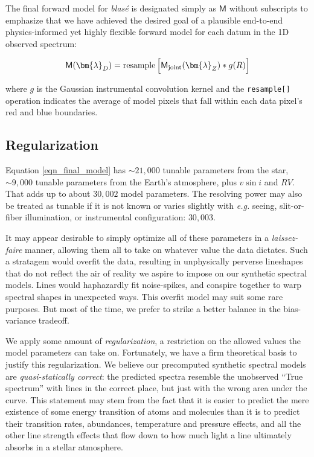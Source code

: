 \documentclass[trackchanges]{aastex631}
\DeclareMathOperator{\resample}{resample}
\begin{document}
The final forward model for \emph{blas\'e} is designated simply as $\mathsf{M}$ without subscripts to emphasize that we have achieved the desired goal of a plausible end-to-end physics-informed yet highly flexible forward model for each datum in the 1D observed spectrum:

\begin{eqnarray}
    \mathsf{M}(\bm{\lambda}_D) = \resample{\Big[\mathsf{M}_{\rm joint}(\bm{\lambda}_Z) * g(R) \Big]} \label{eqn_final_model}
\end{eqnarray}

\noindent where $g$ is the Gaussian instrumental convolution kernel and the \texttt{resample[]} operation indicates the average of model pixels that fall within each data pixel's red and blue boundaries.

\subsection{Regularization}

Equation \ref{eqn_final_model} has $\sim21,000$ tunable parameters from the star, $\sim9,000$ tunable parameters from the Earth's atmosphere, plus $v\sin{i}$ and $RV$.  That adds up to about $30,002$ model parameters.  The resolving power may also be treated as tunable if it is not known or varies slightly with \emph{e.g.} seeing, slit-or-fiber illumination, or instrumental configuration: $30,003$.

It may appear desirable to simply optimize all of these parameters in a \emph{laissez-faire} manner, allowing them all to take on whatever value the data dictates.  Such a stratagem would overfit the data, resulting in unphysically perverse lineshapes that do not reflect the air of reality we aspire to impose on our synthetic spectral models.  Lines would haphazardly fit noise-spikes, and conspire together to warp spectral shapes in unexpected ways.  This overfit model may suit some rare purposes.  But most of the time, we prefer to strike a better balance in the bias-variance tradeoff.

We apply some amount of \emph{regularization}, a restriction on the allowed values the model parameters can take on.  Fortunately, we have a firm theoretical basis to justify this regularization.  We believe our precomputed synthetic spectral models are \emph{quasi-statically correct}: the predicted spectra resemble the unobserved ``True spectrum'' with lines in the correct place, but just with the wrong area under the curve.  This statement may stem from the fact that it is easier to predict the mere existence of some energy transition of atoms and molecules than it is to predict their transition rates, abundances, temperature and pressure effects, and all the other line strength effects that flow down to how much light a line ultimately absorbs in a stellar atmosphere.
\end{document}
